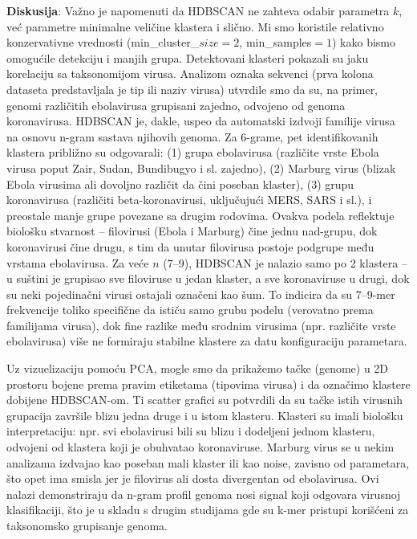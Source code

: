 \documentclass[a4paper,12pt]{article}
\begin{document}

\noindent
\begin{minipage}{\textwidth}
\textbf{Diskusija}: Važno je napomenuti da HDBSCAN ne zahteva odabir parametra $k$, već parametre minimalne veličine klastera i slično. Mi smo koristile relativno konzervativne vrednosti (min\_cluster\_$size = 2$, min\_samples$ = 1$)
kako bismo omogućile detekciju i manjih grupa. Detektovani klasteri pokazali su jaku korelaciju sa
taksonomijom virusa. Analizom oznaka sekvenci (prva kolona dataseta predstavljala je tip ili naziv virusa)
utvrdile smo da su, na primer, genomi različitih ebolavirusa grupisani zajedno, odvojeno od genoma
koronavirusa. HDBSCAN je, dakle, uspeo da automatski izdvoji familije virusa na osnovu n-gram sastava
njihovih genoma. Za 6-grame, pet identifikovanih klastera približno su odgovarali: (1) grupa ebolavirusa
(različite vrste Ebola virusa poput Zair, Sudan, Bundibugyo i sl. zajedno), (2) Marburg virus (blizak Ebola
virusima ali dovoljno različit da čini poseban klaster), (3) grupu koronavirusa (različiti beta-koronavirusi,
uključujući MERS, SARS i sl.), i preostale manje grupe povezane sa drugim rodovima. Ovakva podela
reflektuje biološku stvarnost – filovirusi (Ebola i Marburg) čine jednu nad-grupu, dok koronavirusi čine
drugu, s tim da unutar filovirusa postoje podgrupe među vrstama ebolavirusa. Za veće $n$ (7–9), HDBSCAN
je nalazio samo po 2 klastera – u suštini je grupisao sve filoviruse u jedan klaster, a sve koronaviruse u drugi,
dok su neki pojedinačni virusi ostajali označeni kao šum. To indicira da su 7–9-mer frekvencije toliko
specifične da ističu samo grubu podelu (verovatno prema familijama virusa), dok fine razlike među srodnim
virusima (npr. različite vrste ebolavirusa) više ne formiraju stabilne klastere za datu konfiguraciju
parametara.
\end{minipage}
\vspace{1cm}

Uz vizuelizaciju pomoću PCA, mogle smo da prikažemo tačke (genome) u 2D prostoru bojene prema pravim etiketama (tipovima virusa) i da označimo klastere dobijene HDBSCAN-om. Ti scatter grafici su potvrdili da
su tačke istih virusnih grupacija završile blizu jedna druge i u istom klasteru. Klasteri su imali biološku
interpretaciju: npr. svi ebolavirusi bili su blizu i dodeljeni jednom klasteru, odvojeni od klastera koji je obuhvatao koronaviruse. Marburg virus se u nekim analizama izdvajao kao poseban mali klaster ili kao noise, zavisno
od parametara, što opet ima smisla jer je filovirus ali dosta divergentan od ebolavirusa. Ovi nalazi
demonstriraju da n-gram profil genoma nosi signal koji odgovara virusnoj klasifikaciji, što je u skladu s
drugim studijama gde su k-mer pristupi korišćeni za taksonomsko grupisanje genoma.
\vspace{1cm}
\end{document}
